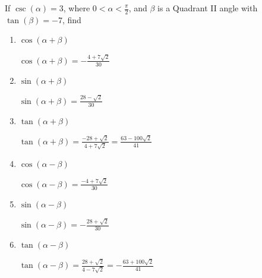 \documentclass{ximera}
\begin{document}
\begin{problem}
If $\csc(\alpha) = 3$, where $0 < \alpha < \frac{\pi}{2}$, and $\beta$ is a Quadrant II angle with $\tan(\beta) = -7$, find

\begin{enumerate}

\item $\cos(\alpha + \beta)$

\begin{solution}
$\cos(\alpha + \beta) = - \frac{4+7\sqrt{2}}{30}$
\end{solution}

\item $\sin(\alpha + \beta)$

\begin{solution}
$\sin(\alpha + \beta) = \frac{28-\sqrt{2}}{30}$
\end{solution}

\item $\tan(\alpha + \beta)$

\begin{solution}
$\tan(\alpha + \beta) = \frac{-28+\sqrt{2}}{4+7\sqrt{2}} = \frac{63-100\sqrt{2}}{41}$
\end{solution}

\item $\cos(\alpha - \beta)$

\begin{solution}
$\cos(\alpha - \beta) =  \frac{-4+7\sqrt{2}}{30}$
\end{solution}

\item $\sin(\alpha - \beta)$

\begin{solution}
$\sin(\alpha - \beta) = - \frac{28+\sqrt{2}}{30}$
\end{solution}

\item $\tan(\alpha - \beta)$

\begin{solution}
$\tan(\alpha - \beta)= \frac{28+\sqrt{2}}{4-7\sqrt{2}} = -\frac{63+100\sqrt{2}}{41}$
\end{solution}

\end{enumerate}
\end{problem}
\end{document}

